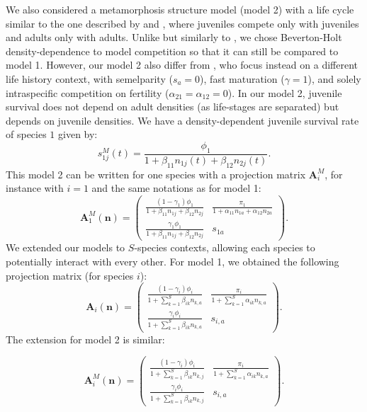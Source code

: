 \documentclass{article}
\begin{document}
We also considered a metamorphosis structure model (model 2) with a life cycle similar to the one described by \citet{moll2008competition} and \citet{cushing2007coexistence}, where juveniles compete only with juveniles and adults only with adults. Unlike \citet{moll2008competition} but similarly to \citet{cushing2007coexistence}, we chose Beverton-Holt density-dependence to model competition so that it can still be compared to model 1. However, our model 2 also differ from \citet{cushing2007coexistence}, who focus instead on a different life history context, with semelparity ($s_a = 0$), fast maturation ($\gamma=1$), and solely intraspecific competition on fertility ($\alpha_{21}=\alpha_{12} = 0$). In our model 2, juvenile survival does not depend on adult densities (as life-stages are separated) but depends on juvenile densities. 
We have a density-dependent juvenile survival rate of species $1$ given by:
\begin{equation}
    s_{1j}^{M}(t) = \frac{\phi_1}{1+\beta_{11}n_{1j}(t)+\beta_{12}n_{2j}(t)}.
\end{equation}
This model 2 can be written for one species with a projection matrix $\mathbf{A}_i^{M}$, for instance with $i=1$ and the same notations as for model 1:
\begin{equation}
    \mathbf{A}_1^{M}(\mathbf{n}) = \begin{pmatrix}
    \frac{(1-\gamma_1)\phi_1}{1+\beta_{11}n_{1j}+\beta_{12}n_{2j}} & \frac{\pi_1}{1+\alpha_{11}n_{1a}+\alpha_{12}n_{2a}} \\
    \frac{\gamma_1\phi_1}{1+\beta_{11}n_{1j}+\beta_{12}n_{2j}} & s_{1a}
    \end{pmatrix}.
\end{equation}\label{eq:MB_model}
We extended our models to $S$-species contexts, allowing each species to potentially interact with every other. For model 1, we obtained the following projection matrix (for species $i$):
\begin{equation}
     \mathbf{A}_i(\mathbf{n}) = 
    \begin{pmatrix}
    \frac{(1-\gamma_i)\phi_i}{1+\sum_{k=1}^{S}\beta_{ik}n_{k,a}} & \frac{\pi_{i}}{1 + \sum_{k=1}^{S}\alpha_{ik}n_{k,a}}\\
    \frac{\gamma_i\phi_i}{1+\sum_{k=1}^{S}\beta_{ik}n_{k,a}}    & s_{i,a}
    \end{pmatrix}.
    \label{eq:combined_model_Sspecies}
\end{equation}
The extension for model 2 is similar:

\begin{equation}
     \mathbf{A}_i^{M}(\mathbf{n}) = 
    \begin{pmatrix}
    \frac{(1-\gamma_i)\phi_i}{1+\sum_{k=1}^{S}\beta_{ik}n_{k,j}} & \frac{\pi_{i}}{1 + \sum_{k=1}^{S}\alpha_{ik}n_{k,a}}\\
    \frac{\gamma_i\phi_i}{1+\sum_{k=1}^{S}\beta_{ik}n_{k,j}}    & s_{i,a}
    \end{pmatrix}.\label{eq:combined_model_Sspecies_MB}
\end{equation}
\end{document}
